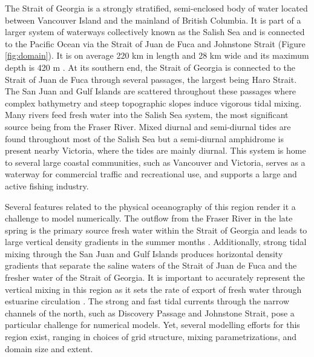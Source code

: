 \documentclass[pdftex,10pt]{article}
\begin{document}
The Strait of Georgia is a strongly stratified, semi-enclosed body of water located between Vancouver Island and the mainland of British Columbia. It is part of a larger system of waterways collectively known as the Salish Sea and is connected to the Pacific Ocean via the Strait of Juan de Fuca and Johnstone Strait (Figure \ref{fig:domain}). It is on average 220 km in length and 28 km wide and its maximum depth is 420 m \citep{thomson1981oceanography}. At its southern end, the Strait of Georgia is connected to the Strait of Juan de Fuca through several passages, the largest being Haro Strait. The San Juan and Gulf Islands are scattered throughout these passages where complex bathymetry and steep topographic slopes induce vigorous tidal mixing. Many rivers feed fresh water into the Salish Sea system, the most significant source being from the Fraser River. Mixed diurnal and semi-diurnal tides are found throughout most of the Salish Sea but a semi-diurnal amphidrome is present nearby Victoria, where the tides are mainly diurnal. This system is home to several large coastal communities, such as Vancouver and Victoria, serves as a waterway for commercial traffic and recreational use, and supports a large and active fishing industry.   

Several features related to the physical oceanography of this region render it a challenge to model numerically. The outflow from the Fraser River in the late spring is the primary source fresh water within the Strait of Georgia and leads to large vertical density gradients in the summer months \citep{thomson1981oceanography}. Additionally, strong tidal mixing through the San Juan and Gulf Islands produces horizontal density gradients that separate the saline waters of the Strait of Juan de Fuca and the fresher water of the Strait of Georgia. It is important to accurately represent the vertical mixing in this region as it sets the rate of export of fresh water through estuarine circulation \citep{masson2004modelling}. The strong and fast tidal currents through the narrow channels of the north, such as Discovery Passage and Johnstone Strait, pose a particular challenge for numerical models. Yet, several modelling efforts for this region exist, ranging in choices of grid structure, mixing parametrizations, and domain size and extent. 
\end{document}
